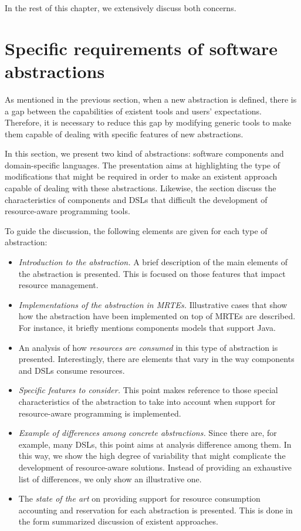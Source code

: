 In the rest of this chapter, we extensively discuss both concerns.

\section{Specific requirements of software abstractions}
As mentioned in the previous section, when a new abstraction is defined, there is a gap between the capabilities of existent tools and users' expectations.
Therefore, it is necessary to reduce this gap by modifying generic tools to make them capable of dealing with specific features of new abstractions.

In this section, we present two kind of abstractions: software components and domain-specific languages.
The presentation aims at highlighting the type of modifications that might be required in order to make an existent approach capable of dealing with these abstractions.
Likewise, the section discuss the characteristics of components and DSLs that difficult the development of resource-aware programming tools.

To guide the discussion, the following elements are given for each type of abstraction:
\begin{itemize}
\item \textit{Introduction to the abstraction.} A brief description of the main elements of the abstraction is presented. This is focused on those features that impact resource management. 

\item \textit{Implementations of the abstraction in MRTEs.}
Illustrative cases that show how the abstraction have been implemented on top of MRTEs are described.
For instance, it briefly mentions components models that support Java.

\item An analysis of how \textit{resources are consumed} in this type of abstraction is presented.
Interestingly, there are elements that vary in the way components and DSLs consume resources.

\item \textit{Specific features to consider.}
This point makes reference to those special characteristics of the abstraction to take into account when support for resource-aware programming is implemented.     

\item \textit{Example of differences among concrete abstractions.}
Since there are, for example, many DSLs, this point aims at analysis difference among them.
In this way, we show the high degree of variability that might complicate the development of resource-aware solutions.
Instead of providing an exhaustive list of differences, we only show an illustrative one.

\item The \textit{state of the art} on providing support for resource consumption accounting and reservation for each abstraction is presented.
This is done in the form summarized discussion of existent approaches. 
\end{itemize}

